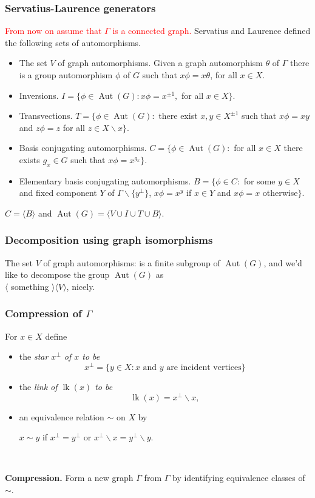 \documentclass{beamer}
\newcommand{\la}{\langle}
\newcommand{\ra}{\rangle}
\def\G{\Gamma }
\newcommand{\Aut}{\operatorname{Aut}}
\newcommand{\bs}{\backslash}
\newcommand{\lk}{\operatorname{lk}}
\newcommand{\bei}{\begin{itemize}}
\newcommand{\eei}{\end{itemize}}
\begin{document}
\begin{frame}
\frametitle{Servatius-Laurence generators}
{\textcolor{red}{From now on assume that $\G$ is a connected graph.
}}
\pause
Servatius and Laurence defined the following sets of automorphisms.
\begin{itemize}
\item The set $V$ of graph automorphisms. Given a graph automorphism
 $\theta$ of $\G$ 
there is a group automorphism $\phi$ of $G$  such that $x\phi =x\theta$, for 
all $x\in X$. 
\item Inversions. $I=\{\phi\in \Aut(G): x\phi=x^{\pm 1},$ for all $x\in X\}$.
\item Transvections. $T=\{\phi\in \Aut(G):$ there exist $x,y\in X^{\pm 1}$ 
such that $x\phi=xy$ and $z\phi=z$ for all $z\in X\backslash x\}$. 
\item Basis conjugating automorphisms. $C=\{\phi\in \Aut(G):$ for all
$x\in X$ there exists $g_x\in G$ such that $x\phi=x^{g_x}\}$. 
\item Elementary basis conjugating automorphisms. $B=\{\phi\in C:$ for some 
$y\in X$ and fixed component $Y$ of $\G\bs  \{y^\perp \}$,   $x\phi =x^y$ if $x\in Y$ and 
$x\phi=x$ otherwise$\}$. 
\end{itemize}
\pause
\begin{theorem}[Laurence] $C=\la B\ra$ and $\Aut(G)=\la V\cup I\cup T\cup B\ra$.
\end{theorem}
\end{frame}
\begin{frame}
\frametitle{Decomposition using graph isomorphisms}
The set $V$ of graph automorphisms: is a finite subgroup of $\Aut(G)$, \pause and 
we'd like to decompose the group $\Aut(G)$ as \\$\la$ something $\ra \la V\ra$, \pause
nicely.

\end{frame}
\begin{frame}
\frametitle{Compression of $\G$}
For $x\in X$ define 
\bei
\item the \em{star} $x^\perp$ of $x$ to be 
\[x^\perp=\{y\in X: x\textrm{ and }y\textrm{ are incident vertices}\}\] \pause 
\item
the \em{link} of $\lk(x)$ to be 
\[\lk(x)=x^\perp\bs x,\] 
\pause
\item
an equivalence relation $\sim$ on $X$ by \\
\centerline{$x\sim y$ if 
$x^\perp=y^\perp$ or $x^\perp\bs x=y^\perp\bs y$. }
~\\
\eei

\pause
{\bf Compression. } 
Form a new graph $\bar\G$ from $\G$ by identifying equivalence classes
of $\sim$.
 \end{frame}
\end{document}

